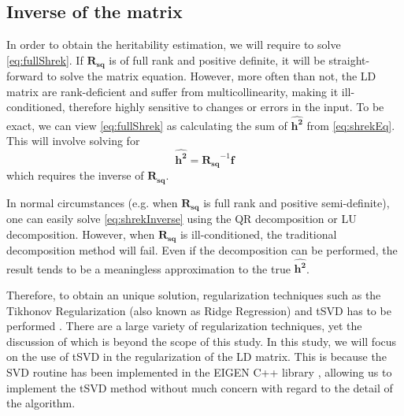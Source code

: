 		\subsection{Inverse of the  matrix}
			In order to obtain the heritability estimation, we will require to solve \cref{eq:fullShrek}. 
			If $\boldsymbol{R_{sq}}$ is of full rank and positive definite, it will be straight-forward to solve the matrix equation.
			However, more often than not, the \gls{LD} matrix are rank-deficient and suffer from multicollinearity, making it ill-conditioned, therefore highly sensitive to changes or errors in the input.
			To be exact, we can view \cref{eq:fullShrek} as calculating the sum of $\boldsymbol{\hat{h^2}}$ from \cref{eq:shrekEq}.
			This will involve solving for
			\begin{equation}
			\boldsymbol{\hat{h^2}} = \boldsymbol{R_{sq}}^{-1}\boldsymbol{f}
			\label{eq:shrekInverse}
			\end{equation}
			which requires the inverse of $\boldsymbol{R_{sq}}$. 
			
			In normal circumstances (e.g. when $\boldsymbol{R_{sq}}$ is full rank and positive semi-definite), one can easily solve \cref{eq:shrekInverse} using the QR decomposition or LU decomposition.
			However, when $\boldsymbol{R_{sq}}$ is ill-conditioned, the traditional decomposition method will fail.
			Even if the decomposition can be performed, the result tends to be a meaningless approximation to the true $\boldsymbol{\hat{h^2}}$. 
			
			Therefore, to obtain an unique solution, regularization techniques such as the Tikhonov Regularization (also known as Ridge Regression) and \gls{tSVD} has to be performed \citep{Neumaier1998}. 
			There are a large variety of regularization techniques, yet the discussion of which is beyond the scope of this study. 
			In this study, we will focus on the use of \gls{tSVD} in the regularization of the \gls{LD} matrix.
			This is because the \gls{SVD} routine has been implemented in the EIGEN C++ library \citep{eigenweb}, allowing us to implement the \gls{tSVD} method without much concern with regard to the detail of the algorithm. 
			
